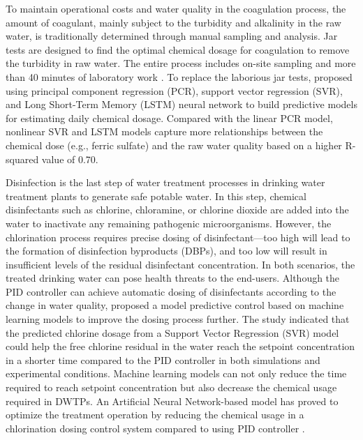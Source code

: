 To maintain operational costs and water quality in the coagulation process, the amount of coagulant, mainly subject to the turbidity and alkalinity in the raw water, is traditionally determined through manual sampling and analysis. Jar tests are designed to find the optimal chemical dosage for coagulation to remove the turbidity in raw water. The entire process includes on-site sampling and more than 40 minutes of laboratory work \citep{ganiEffectPHAlum2017}. To replace the laborious jar tests, \citet{wangIntegratingWaterQuality2022} proposed using principal component regression (PCR), support vector regression (SVR), and Long Short-Term Memory (LSTM) neural network to build predictive models for estimating daily chemical dosage. Compared with the linear PCR model, nonlinear SVR and LSTM models capture more relationships between the chemical dose (e.g., ferric sulfate) and the raw water quality based on a higher R-squared value of 0.70.


Disinfection is the last step of water treatment processes in drinking water treatment plants to generate safe potable water. In this step, chemical disinfectants such as chlorine, chloramine, or chlorine dioxide are added into the water to inactivate any remaining pathogenic microorganisms. However, the chlorination process requires precise dosing of disinfectant---too high will lead to the formation of disinfection byproducts (DBPs), and too low will result in insufficient levels of the residual disinfectant concentration. In both scenarios, the treated drinking water can pose health threats to the end-users. Although the PID controller can achieve automatic dosing of disinfectants according to the change in water quality, \citet{wangModelPredictiveControl2020} proposed a model predictive control based on machine learning models to improve the dosing process further. The study indicated that the predicted chlorine dosage from a Support Vector Regression (SVR) model could help the free chlorine residual in the water reach the setpoint concentration in a shorter time compared to the PID controller in both simulations and experimental conditions. Machine learning models can not only reduce the time required to reach setpoint concentration but also decrease the chemical usage required in DWTPs. An Artificial Neural Network-based model has proved to optimize the treatment operation by reducing the chemical usage in a chlorination dosing control system compared to using PID controller \citep{librantzArtificialNeuralNetworks2018}.

